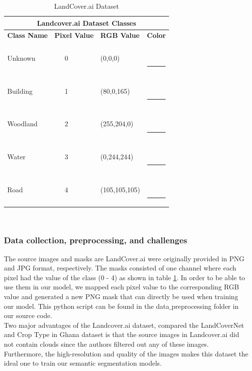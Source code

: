 \documentclass[conference]{IEEEtran}
\begin{document}
\begin{table}[htbp]
\centering
\caption{LandCover.ai Dataset}
\begin{tabular}{|p{1.2cm}|p{0.7cm}|p{1.6cm}|p{0.7cm}|}
 \hline
 \multicolumn{4}{|c|}{\textbf{Landcover.ai Dataset Classes}} \\
 \hline
 \textbf{Class Name} & \textbf{Pixel Value}& \textbf{RGB Value}& \textbf{Color} \\
 \hline
 Unknown &  \ \ \ 0  & (0,0,0) &   \textcolor{black}{\ \ \ \rule{0.2cm}{0.2cm}} \\ 
 \hline
 Building & \ \ \ 1  & (80,0,165) & \textcolor{purple}{\ \ \ \rule{0.2cm}{0.2cm}}\\ 
 \hline
 Woodland & \ \ \ 2  & (255,204,0) &  \textcolor{yellow}{\ \ \ \rule{0.2cm}{0.2cm}}\\ 
 \hline
 Water & \ \ \ 3  & (0,244,244) & \textcolor{cyan}{\ \ \ \rule{0.2cm}{0.2cm}} \\
 \hline
 Road & \ \ \ 4  & (105,105,105) &  \textcolor{gray}{\ \ \ \rule{0.2cm}{0.2cm}} \\
 \hline
\end{tabular}
\label{landcover_ai_classes}
\end{table}
\\

\subsubsection{Data collection, preprocessing, and challenges}
The source images and masks are LandCover.ai were originally provided in PNG and JPG format, respectively. The masks consisted of one channel where each pixel had the value of the class (0 - 4) as shown in table \ref{landcover_ai_classes}. In order to be able to use them in our model, we mapped each pixel value to the corresponding RGB value and generated a new PNG mask that can directly be used when training our model. This python script can be found in the data$\_$preprocessing folder in our source code. \\ \indent
Two major advantages of the Landcover.ai dataset, compared the LandCoverNet and Crop Type in Ghana dataset is that the source images  in Landcover.ai did not contain clouds since the authors \cite{DBLP:journals/corr/abs-2005-02264} filtered out any of these images. Furthermore, the high-resolution and quality of the images makes this dataset the ideal one to train our semantic segmentation models.      
\end{document}
